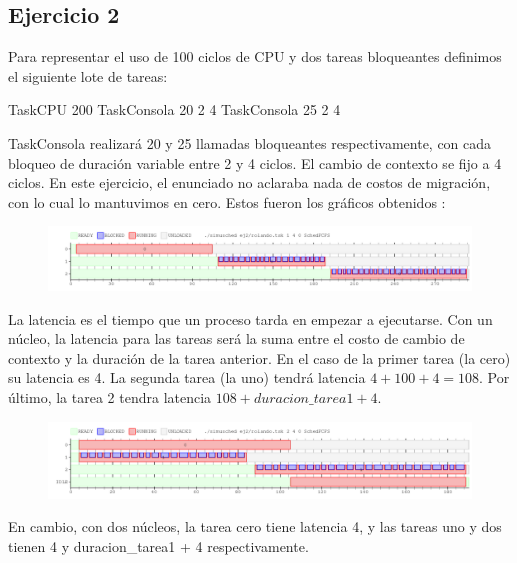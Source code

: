 \subsection{Ejercicio 2}

Para representar el uso de 100 ciclos de CPU y dos tareas bloqueantes definimos el siguiente lote de tareas:\\

\begin{itemize}
TaskCPU 200 
TaskConsola 20 2 4
TaskConsola 25 2 4
\end{itemize}
TaskConsola realizará 20 y 25 llamadas bloqueantes respectivamente, con cada bloqueo de duración variable entre 2 y 4 ciclos. El cambio de contexto se fijo a 4 ciclos. En este ejercicio, el enunciado no aclaraba nada de costos de migración, con lo cual lo mantuvimos en cero. Estos fueron los gráficos obtenidos :



\begin{figure}[h]
  \includegraphics[width=\textwidth]{../ej2/uncore.png}
  \caption{}
\end{figure}

La latencia es el tiempo que un proceso tarda en empezar a ejecutarse. Con un núcleo, la latencia para las tareas será la suma entre el costo de cambio de contexto y la duración de la tarea anterior. En el caso de la primer tarea (la cero) su latencia es 4. La segunda tarea (la uno) tendrá latencia $ 4 + 100 + 4 = 108$. Por último, la tarea 2 tendra latencia $ 108 + duracion\_tarea1 + 4$.



\begin{figure}[h]
  \includegraphics[width=\textwidth]{../ej2/doscores.png}
  \caption{}
\end{figure}

En cambio, con dos núcleos, la tarea cero tiene latencia 4, y las tareas uno y dos tienen 4 y duracion\_tarea1 + 4 respectivamente.

